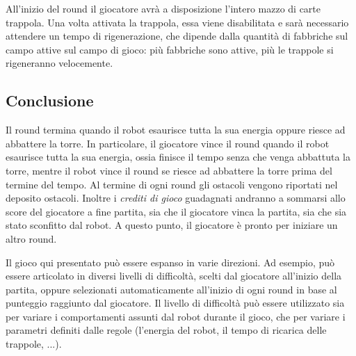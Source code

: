 All'inizio del round il giocatore avrà a disposizione l'intero mazzo di carte trappola. Una volta attivata la trappola, essa viene disabilitata e sarà necessario attendere un tempo di rigenerazione, che dipende dalla quantità di fabbriche sul campo attive sul campo di gioco: più fabbriche sono attive, più le trappole si rigeneranno velocemente. %

	\subsection*{Conclusione} 
Il round termina quando il robot esaurisce tutta la sua energia oppure riesce ad abbattere la torre. In particolare, il giocatore vince il round quando il robot esaurisce tutta la sua energia, ossia finisce il tempo senza che venga abbattuta la torre, mentre il robot vince il round se riesce ad abbattere la torre prima del termine del tempo.
Al termine di ogni round gli ostacoli vengono riportati nel deposito ostacoli. %
Inoltre i \emph{crediti di gioco} guadagnati andranno a sommarsi allo score del giocatore a fine partita, sia che il giocatore vinca la partita, sia che sia stato sconfitto dal robot.
A questo punto, il giocatore è pronto per iniziare un altro round. %

\begin{nota}
Il gioco qui presentato può essere espanso in varie direzioni. Ad esempio, può essere articolato in diversi livelli di difficoltà, scelti dal giocatore all'inizio della partita, oppure selezionati automaticamente all'inizio di ogni round in base al punteggio raggiunto dal giocatore. Il livello di difficoltà può essere utilizzato sia per variare i comportamenti assunti dal robot durante il gioco, che per variare i parametri definiti dalle regole (l'energia del robot, il tempo di ricarica delle trappole, ...).
\end{nota}

